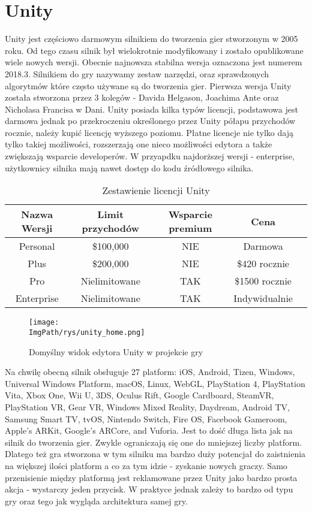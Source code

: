 \documentclass[a4paper,12pt,twoside,openany]{report}
\newcommand{\ImgPath}{.}
\begin{document}
\section{Unity}
Unity jest częściowo darmowym silnikiem do tworzenia gier stworzonym w 2005 roku. Od tego czasu silnik był wielokrotnie modyfikowany i zostało opublikowane wiele nowych wersji. Obecnie najnowsza stabilna wersja oznaczona jest numerem 2018.3. Silnikiem do gry nazywamy zestaw narzędzi, oraz sprawdzonych algorytmów które często używane są do tworzenia gier. Pierwsza wersja Unity została stworzona przez 3 kolegów - Davida Helgason, Joachima Ante oraz Nicholasa Francisa w Dani. Unity posiada kilka typów licencji, podstawowa jest darmowa jednak po przekroczeniu określonego przez Unity półapu przychodów rocznie, należy kupić licencję wyższego poziomu. Płatne licencje nie tylko dają tylko takiej możliwości, rozszerzają one nieco możliwości edytora a także zwiększają wsparcie developerów. W przyapdku najdorższej wersji - enterprise, użytkownicy silnika mają nawet dostęp do kodu źródłowego silnika. 

\begin{table}[h!]
\centering
\begin{tabular}{c|cccc}
Nazwa Wersji & Limit przychodów & Wsparcie premium & Cena \\ \hline
Personal & \$100,000 & NIE & Darmowa \\
Plus & \$200,000 & NIE & \$420 rocznie \\
Pro & Nielimitowane & TAK & \$1500 rocznie \\
Enterprise & Nielimitowane & TAK & Indywidualnie \\
\end{tabular}
\caption{Zestawienie licencji Unity}
\label{table_unity_versions}
\end{table}

\begin{figure}[!htbp]
	\begin{center}
\centering
\texttt{[image: \\ImgPath/rys/unity\_home.png]}
\end{center}
	\caption{Domyślny widok edytora Unity w projekcie gry}
	\label{unity_home}
\end{figure}

Na chwilę obecną silnik obsługuje 27 platform: iOS, Android, Tizen, Windows, Universal Windows Platform, macOS, Linux, WebGL, PlayStation 4, PlayStation Vita, Xbox One, Wii U, 3DS, Oculus Rift, Google Cardboard, SteamVR, PlayStation VR, Gear VR, Windows Mixed Reality, Daydream, Android TV, Samsung Smart TV, tvOS, Nintendo Switch, Fire OS, Facebook Gameroom, Apple's ARKit, Google's ARCore, and Vuforia. Jest to dość długa lista jak na silnik do tworzenia gier. Zwykle ograniczają się one do mniejszej liczby platform. Dlatego też gra stworzona w tym silniku ma bardzo duży potencjał do zaistnienia na większej ilości platform a co za tym idzie - zyskanie nowych graczy. Samo przenisienie między platformą jest reklamowane przez Unity jako bardzo prosta akcja - wystarczy jeden przycisk. W praktyce jednak zależy to bardzo od typu gry oraz tego jak wygląda architektura samej gry.
\end{document}
